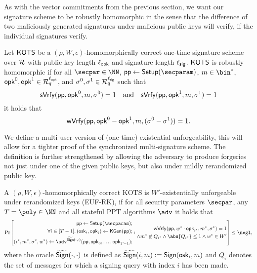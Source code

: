 As with the vector commitments from the previous section, we want our signature scheme to be robustly homomorphic in the sense that the difference of two maliciously generated signatures under malicious public keys will verify, if the individual signatures verify.

\begin{definition}
  \label{def:malhomhots}
  Let $\mathsf{KOTS}$ be a $(\rho,W,\epsilon)$-homomorphically correct one-time signature scheme over $\mathcal{R}$ with public key length ${\ell_{\mathsf{opk}}}$ and signature length ${\ell_{\mathsf{sig}}}$.
  $\mathsf{KOTS}$ is robustly homomorphic if for all $\secpar\in\NN$, $\params\gets\setup(\secparam)$, $m\in\bin^*$, $\mathsf{opk}^0,\mathsf{opk}^1 \in \mathcal{R}_q^{\ell_{\mathsf{opk}}}$, and $\sigma^0,\sigma^1\in\mathcal{R}_q^{\ell_{\mathsf{sig}}}$ such that
  \[
    \mathsf{sVrfy}(\mathsf{pp},\mathsf{opk}^0, m,\sigma^0)=1 \quad \text{and} \quad \mathsf{sVrfy}(\mathsf{pp},\mathsf{opk}^1, m,\sigma^1)=1
  \]
  it holds that
  \[
    \mathsf{wVrfy}(\mathsf{pp},\mathsf{opk}^0-\mathsf{opk}^1, m,(\sigma^0-\sigma^1))=1.
  \]
\end{definition}

We define a multi-user version of (one-time) existential unforgeability, this will allow for a tighter proof of the synchronized multi-signature scheme.
The definition is further strengthened by allowing the adversary to produce forgeries not just under one of the given public keys, but also under mildly rerandomized public key.

\begin{definition}
  A $(\rho,W,\epsilon)$-homomorphically correct KOTS is $W'$-existentially unforgeable under rerandomized keys (EUF-RK), if for all security parameters $\secpar$, any $T=\poly\in\NN$ and all stateful PPT algorithms $\adv$ it holds that
  \[
    \Pr\mleft[
      \begin{aligned}
      \params \gets \setup(\secparam);\\
      \forall i \in [T-1]\ldotp (\osk_i,\opk_i) \gets \kgen(\params);\\
      (i^*,m^*,\sigma^*,w^*) \gets \adv^{\widetilde\sign(\cdot,\cdot)}(\params,\opk_0,\dots,\opk_{T-1});\\
      \end{aligned}:
      \begin{aligned}
      \wverify(\params,w^*\cdot\opk_{i^*},m^*,\sigma^*) = 1\\
      \land m^*\not\in Q_{i^*} \land \abs{Q_{i^*}}\leq 1 \land w^* \in W'
      \end{aligned}
    \mright]\leq \negl,
  \]
  where the oracle $\widetilde{\mathsf{Sign}}(\cdot,\cdot)$ is defined as $\widetilde{\mathsf{Sign}}(i,m) := \mathsf{Sign}(\mathsf{osk}_i,m)$ and $Q_i$ denotes the set of messages for which a signing query with index $i$ has been made.
\end{definition}

